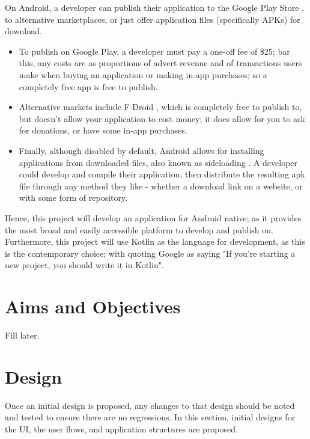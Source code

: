 \documentclass[11pt, a4paper, notitlepage]{report}
\begin{document}
On Android, a developer can publish their application to the Google Play Store \citep{googlePlay}, to alternative marketplaces, or just offer application files (specifically APKs) for download.
\begin{itemize}
	\item To publish on Google Play, a developer must pay a one-off fee of \$25; bar this, any costs are as proportions of advert revenue and of transactions users make when buying an application or making in-app purchases; so a completely free app is free to publish.
	\item Alternative markets include F-Droid \citep{FDroid}, which is completely free to publish to, but doesn't allow your application to cost money; it does allow for you to ask for donations, or have some in-app purchases.
	\item Finally, although disabled by default, Android allows for installing applications from downloaded files, also known as sideloading \citep{sideloading}. A developer could develop and compile their application, then distribute the resulting apk file through any method they like - whether a download link on a website, or with some form of repository.
\end{itemize}

Hence, this project will develop an application for Android native; as it provides the most broad and easily accessible platform to develop and publish on. Furthermore, this project will use Kotlin as the language for development, as this is the contemporary choice; with \citet{KotlinFirst} quoting Google as saying "If you’re starting a new project, you should write it in Kotlin".

\chapter{Aims and Objectives}
Fill later.
\chapter{Design}
Once an initial design is proposed, any changes to that design should be noted and tested to ensure there are no regressions. In this section, initial designs for the UI, the user flows, and application structures are proposed.
\end{document}
